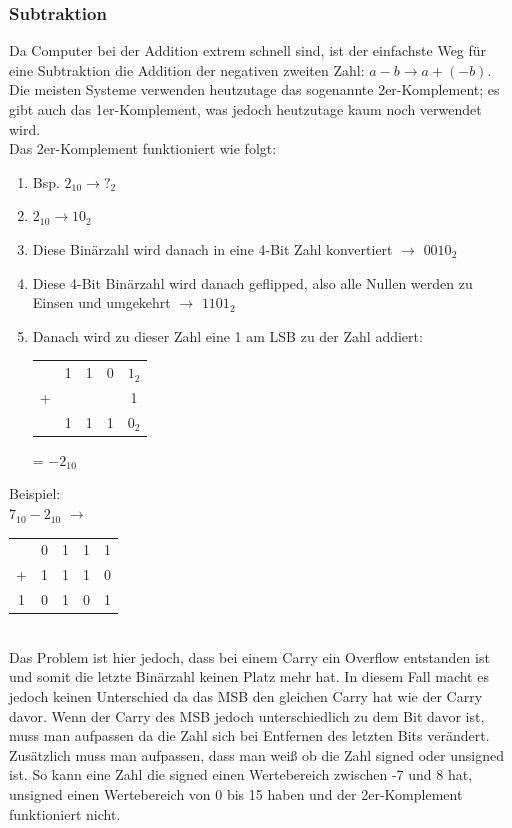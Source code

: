 \documentclass{article}
\begin{document}
		\subsubsection{Subtraktion}
			Da Computer bei der Addition extrem schnell sind, ist der einfachste Weg für eine Subtraktion die Addition der negativen zweiten Zahl: $a-b \to a+(-b)$. Die meisten Systeme verwenden heutzutage das sogenannte 2er-Komplement; es gibt auch das 1er-Komplement, was jedoch heutzutage kaum noch verwendet wird. \\
			Das 2er-Komplement funktioniert wie folgt:
			\begin{enumerate}
				\item{Bsp. $2_{10} \to ?_2$}
				\item{$2_{10} \to 10_2$}
				\item{Diese Binärzahl wird danach in eine 4-Bit Zahl konvertiert $\to$ $0010_2$}
				\item{Diese 4-Bit Binärzahl wird danach geflipped, also alle Nullen werden zu Einsen und umgekehrt $\to$ $1101_2$}
				\item{Danach wird zu dieser Zahl eine 1 am LSB zu der Zahl addiert: 
					\begin{tabular}{ccccc}
						&1&1&0&$1_2$ \\
						+&&&&1 \\ \midrule
						&1&1&1&$0_2$ \\
					\end{tabular} = $-2_{10}$}
			\end{enumerate}
			Beispiel: \\
			$7_{10} - 2_{10}$ $\to$ \begin{tabular}{ccccc}
				&0&1&1&1 \\
				+&1&1&1&0 \\ \midrule
				1&0&1&0&1 \\
			\end{tabular} \\
			Das Problem ist hier jedoch, dass bei einem Carry ein Overflow entstanden ist und somit die letzte Binärzahl keinen Platz mehr hat. In diesem Fall macht es jedoch keinen Unterschied da das MSB den gleichen Carry hat wie der Carry davor. Wenn der Carry des MSB jedoch unterschiedlich zu dem Bit davor ist, muss man aufpassen da die Zahl sich bei Entfernen des letzten Bits verändert. Zusätzlich muss man aufpassen, dass man weiß ob die Zahl signed oder unsigned ist. So kann eine Zahl die signed einen Wertebereich zwischen -7 und 8 hat, unsigned einen Wertebereich von 0 bis 15 haben und der 2er-Komplement funktioniert nicht.
\end{document}
